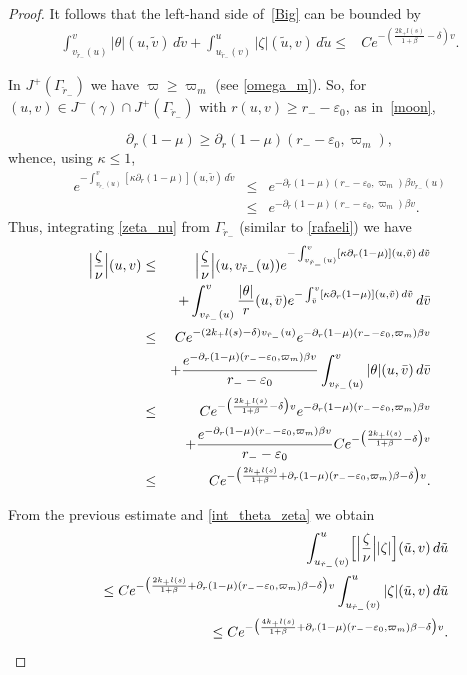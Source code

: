 \documentclass[a4paper,11pt,oneside,reqno]{amsart}
\newcommand{\kk}{k_+}
\newcommand{\eps}{\varepsilon}
\newcommand{\ckrm}{\check r_-}
\newcommand{\vgr}{v_{\ckrm}}
\newcommand{\ugr}{u_{\ckrm}}
\begin{document}
\begin{proof}
It follows that the left-hand side of~\eqref{Big} can be bounded by
\begin{eqnarray}
\int_{\vgr(u)}^v|\theta|(u,\tilde v)\,d\tilde v+\int_{\ugr(v)}^u|\zeta|(\tilde u,v)\,d\tilde u\leq
&Ce^{-\left(\frac{2\kk l(s)}{1+\beta}-\delta\right)v}.\label{int_theta_zeta}
\end{eqnarray}

In $J^+(\Gamma_{\ckrm})$ we have $\varpi\geq\varpi_m$ (see \eqref{omega_m}). So, for $(u,v)\in J^-(\gamma)\cap J^+(\Gamma_{\ckrm})$ with $r(u,v)\geq r_--\eps_0$,
as in~\eqref{moon},

\begin{equation}\label{desigual}
\partial_r(1-\mu)\geq \partial_r(1-\mu)(r_--\eps_0,\varpi_m),
\end{equation}
whence, using $\kappa \leq 1$,
\begin{eqnarray*}
e^{-\int_{\vgr(u)}^{v}[\kappa\partial_r(1-\mu)](u,\tilde v)\,d\tilde v}&\leq&
e^{-\partial_r(1-\mu)(r_--\eps_0,\varpi_m)\beta\vgr(u)}\\ &\leq& e^{-\partial_r(1-\mu)(r_--\eps_0,\varpi_m)\beta v}.
\end{eqnarray*}
Thus, integrating \eqref{zeta_nu} from $\Gamma_{\ckrm}$ (similar to \eqref{rafaeli}) we have
\begin{eqnarray} 
\nonumber
\Bigl|\frac\zeta\nu\Bigr|(u,v)&\leq&\Bigl|\frac\zeta\nu\Bigr|(u,\vgr(u))
e^{-\int_{\vgr(u)}^{v}[\kappa\partial_r(1-\mu)](u,\tilde v)\,d\tilde v}
\\
\nonumber
&&+\int_{\vgr(u)}^{v}\frac{|\theta|} r(u,\bar v)e^{-\int_{\bar v}^{v}[\kappa
\partial_r(1-\mu)](u,\tilde{v})\,d\tilde{v}}\,d\bar v
\\
\nonumber
&\leq&Ce^{-(2\kk l(s)-\delta)\vgr(u)}e^{-\partial_r(1-\mu)(r_--\eps_0,\varpi_m)\beta v}
\\
\nonumber
&&+\frac{e^{-\partial_r(1-\mu)(r_--\eps_0,\varpi_m)\beta v}}{r_--\eps_0}\int_{\vgr(u)}^{v}|\theta|(u,\bar v)\,d\bar v
\\
\nonumber
&\leq&Ce^{-\bigl(\frac{2\kk l(s)}{1+\beta}-\delta\bigr) v}e^{-\partial_r(1-\mu)(r_--\eps_0,\varpi_m)\beta v}
\\
\nonumber
&&+\frac{e^{-\partial_r(1-\mu)(r_--\eps_0,\varpi_m)\beta v}}{r_--\eps_0}Ce^{-\bigl(\frac{2\kk l(s)}{1+\beta}-\delta\bigr)v}
\\
&\leq&Ce^{-\bigl(\frac{2\kk l(s)}{1+\beta}+\partial_r(1-\mu)(r_--\eps_0,\varpi_m)\beta-\delta\bigr) v}.\label{zetaNuGamma}
\end{eqnarray}

From the previous estimate and \eqref{int_theta_zeta} we obtain
\begin{eqnarray}
&&\int_{\ugr(v)}^u\Bigl[\Bigl|\frac\zeta\nu\Bigr||\zeta|\Bigr](\tilde u,v)\,d\tilde u\nonumber\\ 
&&\ \ \ \ \leq
Ce^{-\bigl(\frac{2\kk l(s)}{1+\beta}+\partial_r(1-\mu)(r_--\eps_0,\varpi_m)\beta-\delta\bigr) v}
\int_{\ugr(v)}^u|\zeta|(\tilde u,v)\,d\tilde u\nonumber\\
&&\ \ \ \ \leq Ce^{-\bigl(\frac{4\kk l(s)}{1+\beta}+\partial_r(1-\mu)(r_--\eps_0,\varpi_m)\beta-\delta\bigr) v}.\label{K}
\end{eqnarray}


\end{proof}
\end{document}
